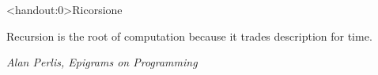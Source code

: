 \begin{frame}<handout:0>{Ricorsione}

\setlength{}
\epigraph{\alert{Recursion is the root of computation because it trades description for time.}
}{\textit{Alan Perlis, Epigrams on Programming}}


\begin{center}
\end{center}

\end{frame}


